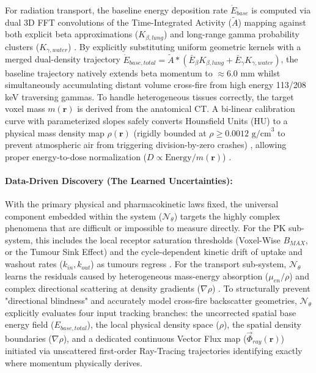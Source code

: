 \documentclass[10pt,letterpaper]{article}
\begin{document}
For radiation transport, the baseline energy deposition rate $\dot{E}_{base}$ is computed via dual 3D FFT convolutions of the Time-Integrated Activity ($\tilde{A}$) mapping against both explicit beta approximations ($K_{\beta, lung}$) and long-range gamma probability clusters ($K_{\gamma, water}$) \cite{PistoneAuditore2022}. By explicitly substituting uniform geometric kernels with a merged dual-density trajectory $\dot{E}_{base, total} = \tilde{A} \ast (\bar{E}_\beta K_{\beta, lung} + \bar{E}_\gamma K_{\gamma, water})$, the baseline trajectory natively extends beta momentum to $\approx 6.0 \text{ mm}$ whilst simultaneously accumulating distant volume cross-fire from high energy 113/208 keV traversing gammas. To handle heterogeneous tissues correctly, the target voxel mass $m(\mathbf{r})$ is derived from the anatomical CT. A bi-linear calibration curve with parameterized slopes safely converts Hounsfield Units (HU) to a physical mass density map $\rho(\mathbf{r})$ (rigidly bounded at $\rho \geq 0.0012 \text{ g/cm}^3$ to prevent atmospheric air from triggering division-by-zero crashes) \cite{GtzSchmidkonz2019}, allowing proper energy-to-dose normalization ($D \propto \text{Energy} / m(\mathbf{r})$) \cite{StabinMadsen2019, BaileyMarquis2022}.

\paragraph{Data-Driven Discovery (The Learned Uncertainties):}
With the primary physical and pharmacokinetic laws fixed, the universal component embedded within the system ($\mathcal{N}_\theta$) targets the highly complex phenomena that are difficult or impossible to measure directly. For the PK sub-system, this includes the local receptor saturation thresholds (Voxel-Wise $B_{MAX}$, or the Tumour Sink Effect) \cite{BegumThieme2018} and the cycle-dependent kinetic drift of uptake and washout rates ($k_{in}, k_{out}$) as tumours regress \cite{OkamotoThieme2016, SiebingaVeen2024, SiebingaPriv2023}. For the transport sub-system, $\mathcal{N}_\theta$ learns the residuals caused by heterogeneous mass-energy absorption ($\mu_{en}/\rho$) and complex directional scattering at density gradients ($\nabla \rho$) \cite{MikellKappadath2016, BaileyMarquis2022}. To structurally prevent "directional blindness" and accurately model cross-fire backscatter geometries, $\mathcal{N}_\theta$ explicitly evaluates four input tracking branches: the uncorrected spatial base energy field ($E_{base, total}$), the local physical density space ($\rho$), the spatial density boundaries ($\nabla \rho$), and a dedicated continuous Vector Flux map ($\vec{\Phi}_{ray}(\mathbf{r})$) initiated via unscattered first-order Ray-Tracing trajectories identifying exactly where momentum physically derives.
\end{document}

